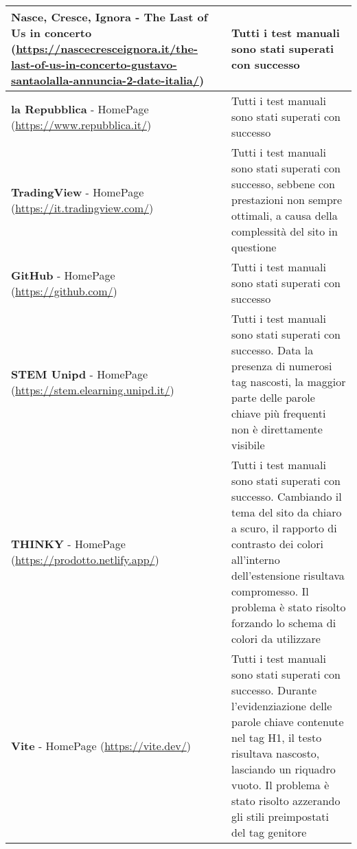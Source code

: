 \begin{tabularx}{\textwidth}{>{\raggedright\arraybackslash}X >{\raggedright\arraybackslash}X}
\hline
\textbf{Nasce, Cresce, Ignora} - The Last of Us in concerto (\url{https://nascecresceignora.it/the-last-of-us-in-concerto-gustavo-santaolalla-annuncia-2-date-italia/}) & Tutti i test manuali sono stati superati con successo \\
\hline
\textbf{la Repubblica} - HomePage (\url{https://www.repubblica.it/}) & Tutti i test manuali sono stati superati con successo \\
\hline
\textbf{TradingView} - HomePage (\url{https://it.tradingview.com/}) & Tutti i test manuali sono stati superati con successo, sebbene con prestazioni non sempre ottimali, a causa della complessità del sito in questione \\
\hline
\textbf{GitHub} - HomePage (\url{https://github.com/}) & Tutti i test manuali sono stati superati con successo \\
\hline
\textbf{STEM Unipd} - HomePage (\url{https://stem.elearning.unipd.it/}) & Tutti i test manuali sono stati superati con successo. Data la presenza di numerosi tag nascosti, la maggior parte delle parole chiave più frequenti non è direttamente visibile \\
\hline
\textbf{THINKY} - HomePage (\url{https://prodotto.netlify.app/}) & Tutti i test manuali sono stati superati con successo. Cambiando il tema del sito da chiaro a scuro, il rapporto di contrasto dei colori all’interno dell’estensione risultava compromesso. Il problema è stato risolto forzando lo schema di colori da utilizzare \\
\hline
\textbf{Vite} - HomePage (\url{https://vite.dev/}) & Tutti i test manuali sono stati superati con successo. Durante l’evidenziazione delle parole chiave contenute nel tag H1, il testo risultava nascosto, lasciando un riquadro vuoto. Il problema è stato risolto azzerando gli stili preimpostati del tag genitore \\
\end{tabularx}
